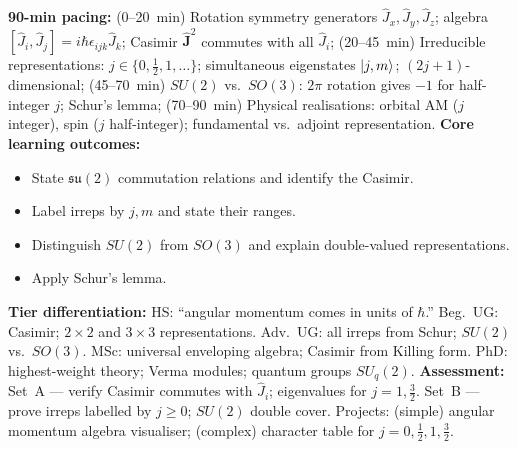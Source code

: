 \documentclass[11pt,a4paper]{article}
\begin{document}
\begin{tcolorbox}[modulebox, title={Module~II.3 --- Lecture L01: The $\mathfrak{su}(2)$ Algebra}]
\textbf{90-min pacing:} (0--20~min) Rotation symmetry generators $\hat{J}_x,\hat{J}_y,\hat{J}_z$; algebra $[\hat{J}_i,\hat{J}_j]=i\hbar\epsilon_{ijk}\hat{J}_k$; Casimir $\hat{\mathbf{J}}^2$ commutes with all $\hat{J}_i$; (20--45~min) Irreducible representations: $j\in\{0,\tfrac{1}{2},1,\ldots\}$; simultaneous eigenstates $\ket{j,m}$; $(2j+1)$-dimensional; (45--70~min) $SU(2)$ vs.\ $SO(3)$: $2\pi$ rotation gives $-1$ for half-integer $j$; Schur's lemma; (70--90~min) Physical realisations: orbital AM ($j$ integer), spin ($j$ half-integer); fundamental vs.\ adjoint representation.
\medskip\textbf{Core learning outcomes:}
\begin{itemize}[leftmargin=1.4em,topsep=2pt,itemsep=1pt]
  \item State $\mathfrak{su}(2)$ commutation relations and identify the Casimir.
  \item Label irreps by $j,m$ and state their ranges.
  \item Distinguish $SU(2)$ from $SO(3)$ and explain double-valued representations.
  \item Apply Schur's lemma.
\end{itemize}
\medskip\textbf{Tier differentiation:}
HS: ``angular momentum comes in units of $\hbar$.''
Beg.\ UG: Casimir; $2\times2$ and $3\times3$ representations.
Adv.\ UG: all irreps from Schur; $SU(2)$ vs.\ $SO(3)$.
MSc: universal enveloping algebra; Casimir from Killing form.
PhD: highest-weight theory; Verma modules; quantum groups $SU_q(2)$.
\medskip\textbf{Assessment:}
Set~A --- verify Casimir commutes with $\hat{J}_i$; eigenvalues for $j=1,\tfrac{3}{2}$.
Set~B --- prove irreps labelled by $j\geq 0$; $SU(2)$ double cover.
Projects: (simple) angular momentum algebra visualiser; (complex) character table for $j=0,\tfrac{1}{2},1,\tfrac{3}{2}$.
\end{tcolorbox}

\medskip
\end{document}
